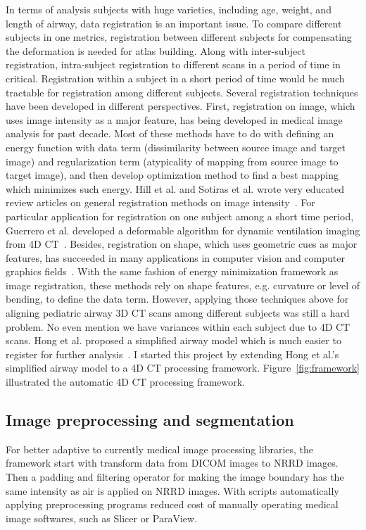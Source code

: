 In terms of analysis subjects with huge varieties, including age, weight, and length of airway, data registration is an important issue.
To compare different subjects in one metrics, registration between different subjects for compensating the deformation is needed for atlas building.
Along with inter-subject registration, intra-subject registration to different scans in a period of time in critical.
Registration within a subject in a short period of time would be much tractable for registration among different subjects.
Several registration techniques have been developed in different perspectives.
First, registration on image, which uses image intensity as a major feature, has being developed in medical image analysis for past decade.
Most of these methods have to do with defining an energy function with data term (dissimilarity between source image and target image) and regularization term (atypicality of mapping from source image to target image),
and then develop optimization method to find a best mapping which minimizes such energy.
Hill et al. and Sotiras et al. wrote very educated review articles on general registration methods on image intensity~\cite{hill2001medical,otiras2013deformable}.
For particular application for registration on one subject among a short time period, Guerrero et al. developed a deformable algorithm for dynamic ventilation imaging from 4D CT~\cite{guerrero2006dynamic}.
Besides, registration on shape, which uses geometric cues as major features, has succeeded in many applications in computer vision and computer graphics fields~\cite{belongie2002shape,li2012temporally}.
With the same fashion of energy minimization framework as image registration, these methods rely on shape features, e.g. curvature or level of bending, to define the data term.
However, applying those techniques above for aligning pediatric airway 3D CT scans among different subjects was still a hard problem.
No even mention we have variances within each subject due to 4D CT scans.
Hong et al. proposed a simplified airway model which is much easier to register for further analysis~\cite{hong2014statistical}.
I started this project by extending Hong et al.'s simplified airway model to a 4D CT processing framework.
Figure~\ref{fig:framework} illustrated the automatic 4D CT processing framework.


\subsection{Image preprocessing and segmentation}
\label{sec:image_preprocessing_and_segmentation}
For better adaptive to currently medical image processing libraries, the framework start with transform data from DICOM images to NRRD images.
Then a padding and filtering operator for making the image boundary has the same intensity as air is applied on NRRD images.
With scripts automatically applying preprocessing programs reduced cost of manually operating medical image softwares, such as Slicer or ParaView.

